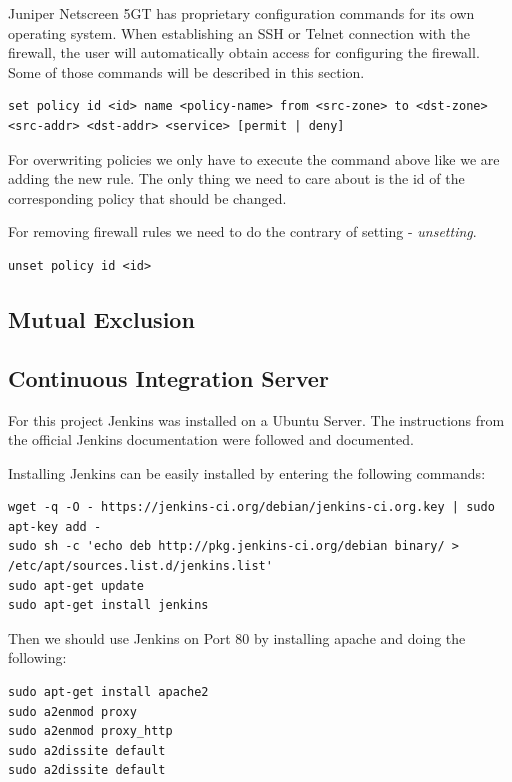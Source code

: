 \documentclass[11pt, a4paper]{article}
\begin{document}
Juniper Netscreen 5GT has proprietary configuration commands for its own operating system. When establishing an SSH or Telnet connection with the firewall, the user will automatically obtain access for configuring the firewall. Some of those commands will be described in this section. 

\begin{lstlisting}
set policy id <id> name <policy-name> from <src-zone> to <dst-zone> <src-addr> <dst-addr> <service> [permit | deny]
\end{lstlisting}

For overwriting policies we only have to execute the command above like we are adding the new rule. The only thing we need to care about is the id of the corresponding policy that should be changed. 

For removing firewall rules we need to do the contrary of setting - \textit{unsetting}.

\begin{lstlisting}
unset policy id <id> 
\end{lstlisting}

\subsection{Mutual Exclusion}


\subsection{Continuous Integration Server}

For this project Jenkins was installed on a Ubuntu Server. The instructions from the official Jenkins documentation \cite{jenkins:ubuntu} were followed and documented. 

Installing Jenkins can be easily installed by entering the following commands: 

\begin{lstlisting}
wget -q -O - https://jenkins-ci.org/debian/jenkins-ci.org.key | sudo apt-key add -
sudo sh -c 'echo deb http://pkg.jenkins-ci.org/debian binary/ > /etc/apt/sources.list.d/jenkins.list'
sudo apt-get update
sudo apt-get install jenkins 
\end{lstlisting}

Then we should use Jenkins on Port 80 by installing apache and doing the following:

\begin{lstlisting}
sudo apt-get install apache2
sudo a2enmod proxy
sudo a2enmod proxy_http
sudo a2dissite default
sudo a2dissite default
\end{lstlisting}
\end{document}

